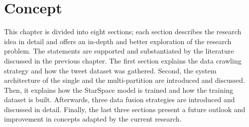\chapter{Concept}
\label{chap:concept}
This chapter is divided into eight sections; each section describes the research idea in detail and offers an in-depth and better exploration of the research problem. The statements are supported and substantiated by the literature discussed in the previous chapter. The first section explains the data crawling strategy and how the tweet dataset was gathered. Second, the system architecture of the single and the multi-partition are introduced and discussed. Then, it explains how the StarSpace model is trained and how the training dataset is built. Afterwards, three data fusion strategies are introduced and discussed in detail. Finally, the last three sections present a future outlook and improvement in concepts adapted by the current research.
